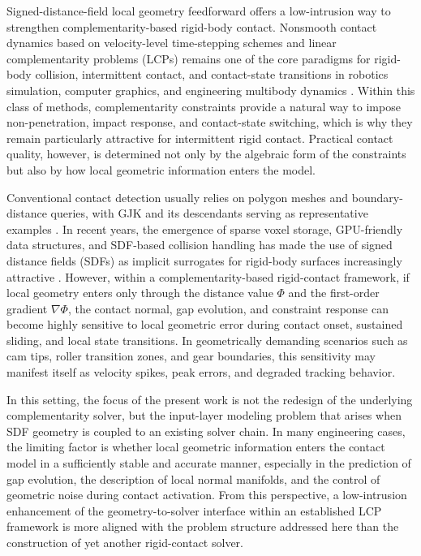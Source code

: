 Signed-distance-field local geometry feedforward offers a low-intrusion way to strengthen complementarity-based rigid-body contact. Nonsmooth contact dynamics based on velocity-level time-stepping schemes and linear complementarity problems (LCPs) remains one of the core paradigms for rigid-body collision, intermittent contact, and contact-state transitions in robotics simulation, computer graphics, and engineering multibody dynamics \cite{flores2022contact,wang2021nonsmooth,stewart1996implicit,anitescu1997formulating}. Within this class of methods, complementarity constraints provide a natural way to impose non-penetration, impact response, and contact-state switching, which is why they remain particularly attractive for intermittent rigid contact. Practical contact quality, however, is determined not only by the algebraic form of the constraints but also by how local geometric information enters the model.

Conventional contact detection usually relies on polygon meshes and boundary-distance queries, with GJK and its descendants serving as representative examples \cite{gilbert1988fast,wang2021collision}. In recent years, the emergence of sparse voxel storage, GPU-friendly data structures, and SDF-based collision handling has made the use of signed distance fields (SDFs) as implicit surrogates for rigid-body surfaces increasingly attractive \cite{museth2021nanovdb,macklin2020sdfcollision,liu2024sdfsdf,lai2024unifying,lopez2024convexsdf}. However, within a complementarity-based rigid-contact framework, if local geometry enters only through the distance value $\Phi$ and the first-order gradient $\nabla \Phi$, the contact normal, gap evolution, and constraint response can become highly sensitive to local geometric error during contact onset, sustained sliding, and local state transitions. In geometrically demanding scenarios such as cam tips, roller transition zones, and gear boundaries, this sensitivity may manifest itself as velocity spikes, peak errors, and degraded tracking behavior.

In this setting, the focus of the present work is not the redesign of the underlying complementarity solver, but the input-layer modeling problem that arises when SDF geometry is coupled to an existing solver chain. In many engineering cases, the limiting factor is whether local geometric information enters the contact model in a sufficiently stable and accurate manner, especially in the prediction of gap evolution, the description of local normal manifolds, and the control of geometric noise during contact activation. From this perspective, a low-intrusion enhancement of the geometry-to-solver interface within an established LCP framework is more aligned with the problem structure addressed here than the construction of yet another rigid-contact solver.

